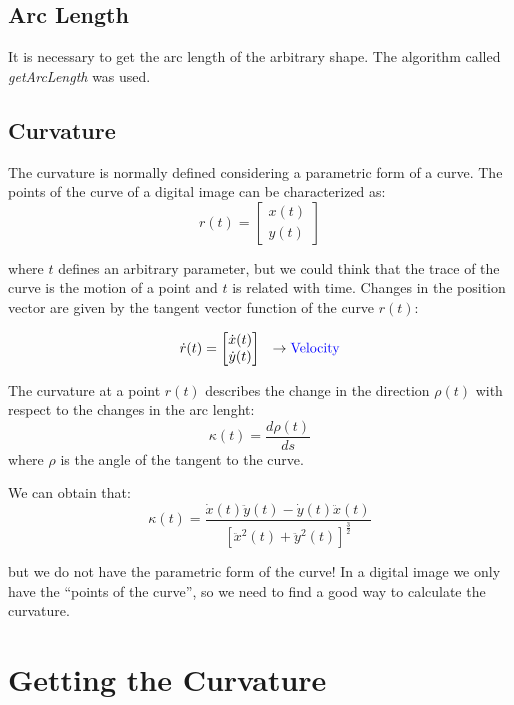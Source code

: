 \documentclass{ws-procs9x6}
\begin{document}
\newpage
\subsection{Arc Length}
\label{sec:arclength}
It is necessary to get the arc length of the arbitrary
shape. The algorithm called \emph{getArcLength} was used.

\subsection{Curvature}

The curvature is normally defined considering a parametric form of a curve.
The points of the curve of a digital image can be characterized  as:
    $$r(t)=\begin{bmatrix}x(t) \\ y(t) \end{bmatrix}$$
    
where $t$ defines an arbitrary parameter, but we could think that the
trace of the curve is the motion of a point and $t$ is related with
time. Changes in the position vector are given by the tangent vector
function of the curve $r(t)$:

    \begin{equation}
      \dot{r}(t)=\begin{bmatrix}\dot{x}(t) \\ \dot{y}(t) \end{bmatrix} \ \ \rightarrow \text{{\color{blue} Velocity}}
    \end{equation}


The curvature at a point $r(t)$ describes the change in the direction $\rho(t)$ with respect to the changes in the arc lenght:
$$\kappa(t)=\frac{d\rho(t)}{ds}$$
where $\rho$ is the angle of the tangent to the curve.

We can obtain that:
    $$\kappa(t) = \frac{\dot{x}(t)\ddot{y}(t)- \dot{y}(t)\ddot{x}(t)}{[\ddot{x}^{2}(t) + \ddot{y}^{2}(t)]^{\frac{3}{2}}}$$


but we do not have the parametric form of the curve! In a digital
image we only have the ``points of the curve'', so we need to find a
good way to calculate the curvature.

\section{Getting the Curvature}
\end{document}
